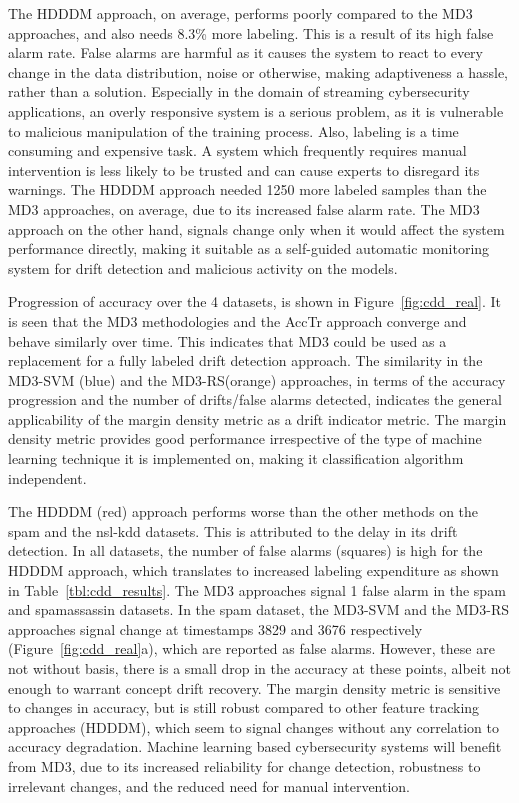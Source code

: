 \documentclass[authoryear,3p,times,twocolumn]{elsarticle}
\begin{document}
The HDDDM approach, on average, performs poorly compared to the MD3 approaches, and also needs 8.3\% more labeling. This is a result of its high false alarm rate. False alarms are harmful as it causes the system to react to every change in the data distribution, noise or otherwise, making adaptiveness a hassle, rather than a solution. Especially in the domain of streaming cybersecurity applications, an overly responsive system is a serious problem, as it is vulnerable to malicious manipulation of the training process. Also, labeling is a time consuming and expensive task. A system which frequently requires manual intervention is less likely to be trusted and can cause experts to disregard its warnings. The HDDDM approach needed 1250 more labeled samples than the MD3 approaches, on average, due to its increased false alarm rate. The MD3 approach on the other hand, signals change only when it would affect the system performance directly, making it suitable as a self-guided automatic monitoring system for drift detection and malicious activity on the models.

Progression of accuracy over the 4 datasets, is shown in Figure~\ref{fig:cdd_real}. It is seen that the MD3 methodologies and the AccTr approach converge and behave similarly over time. This indicates that MD3 could be used as a replacement for a fully labeled drift detection approach. The similarity in the MD3-SVM (blue) and the MD3-RS(orange) approaches, in terms of the accuracy progression and the number of drifts/false alarms detected, indicates the general applicability of the margin density metric as a drift indicator metric. The margin density metric provides good performance irrespective of the type of machine learning technique it is implemented on, making it classification algorithm independent. 

The HDDDM (red) approach performs worse than the other methods on the spam and the nsl-kdd datasets. This is attributed to the delay in its drift detection. In all datasets, the number of false alarms (squares) is high for the HDDDM approach, which translates to increased labeling expenditure as shown in Table~\ref{tbl:cdd_results}. The MD3 approaches signal 1 false alarm in the spam and spamassassin datasets. In the spam dataset, the MD3-SVM and the MD3-RS approaches signal change at timestamps 3829 and 3676 respectively (Figure~\ref{fig:cdd_real}a), which are reported as false alarms. However, these are not without basis, there is a small drop in the accuracy at these points, albeit not enough to warrant concept drift recovery. The margin density metric is sensitive to changes in accuracy, but is still robust compared to other feature tracking approaches (HDDDM), which seem to signal changes without any correlation to accuracy degradation. Machine learning based cybersecurity systems will benefit from MD3, due to its increased reliability for change detection, robustness to irrelevant changes, and the reduced need for manual intervention.
\end{document}
